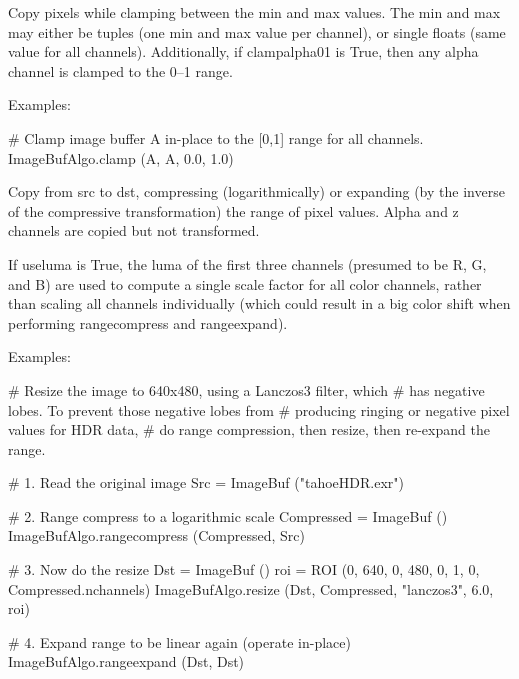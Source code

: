 Copy pixels while clamping
between the {\cf min} and {\cf max} values.  The {\cf min} and {\cf max}
may either be tuples (one min and max value per channel), or single
{\cf floats} (same value for all channels).  Additionally, if
{\cf clampalpha01} is {\cf True}, then any alpha 
channel is clamped to the 0--1 range.

\smallskip
\noindent Examples:
\begin{code}
    # Clamp image buffer A in-place to the [0,1] range for all channels.
    ImageBufAlgo.clamp (A, A, 0.0, 1.0)
\end{code}
\apiend


 
 

Copy from {\cf src} to {\cf dst}, compressing (logarithmically) or expanding
(by the inverse of the compressive transformation) the range of pixel
values.  Alpha and z channels are copied but not transformed.

If {\cf useluma} is {\cf True}, the luma of the first three channels (presumed
to be R, G, and B) are used to compute a single scale factor for all
color channels, rather than scaling all channels individually (which
could result in a big color shift when performing {\cf rangecompress}
and {\cf rangeexpand}).

\smallskip
\noindent Examples:
\begin{code}
    # Resize the image to 640x480, using a Lanczos3 filter, which
    # has negative lobes. To prevent those negative lobes from
    # producing ringing or negative pixel values for HDR data,
    # do range compression, then resize, then re-expand the range.

    # 1. Read the original image
    Src = ImageBuf ("tahoeHDR.exr")

    # 2. Range compress to a logarithmic scale
    Compressed = ImageBuf ()
    ImageBufAlgo.rangecompress (Compressed, Src)

    # 3. Now do the resize
    Dst = ImageBuf ()
    roi = ROI (0, 640, 0, 480, 0, 1, 0, Compressed.nchannels)
    ImageBufAlgo.resize (Dst, Compressed, "lanczos3", 6.0, roi)

    # 4. Expand range to be linear again (operate in-place)
    ImageBufAlgo.rangeexpand (Dst, Dst)
\end{code}
\apiend


